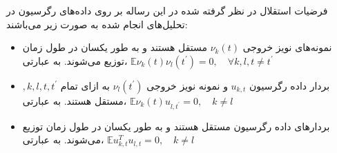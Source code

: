 \begin{assumption}\label{Assum}
	فرضیات استقلال در نظر گرفته شده در این رساله بر روی داده‌های رگرسیون در تحلیل‌های انجام شده به صورت زیر می‌باشند:
	\begin{itemize}\label{Assum2}
		\item 
		نمونه‌های نویز خروجی $\nu_k(t)$  مستقل هستند و به طور یکسان در طول زمان توزیع می‌شوند. به عبارتی، 	
		$\mathbb{E} \nu_k(t)\nu_l(t^{'})=0, \quad \forall k,l, t\ne t^{'}$
		\item 
		بردار داده رگرسیون $u_{k,t}$ و نمونه نویز خروجی $\nu_l(t^{'})$ به ازای تمام $,k,l,t,t^{'}$ مستقل هستند. به عبارتی، 	 
		$\mathbb{E} \nu_k(t)u_{l,t^{'}}=0, \quad k\ne l$
		\item 
		بردارهای داده رگرسیون مستقل هستند و به طور یکسان در طول زمان توزیع می‌شوند. به عبارتی، 	 $\mathbb{E} u_{k,t}^T u_{l,t}=0, \quad k\ne l$
	\end{itemize}
\end{assumption}


